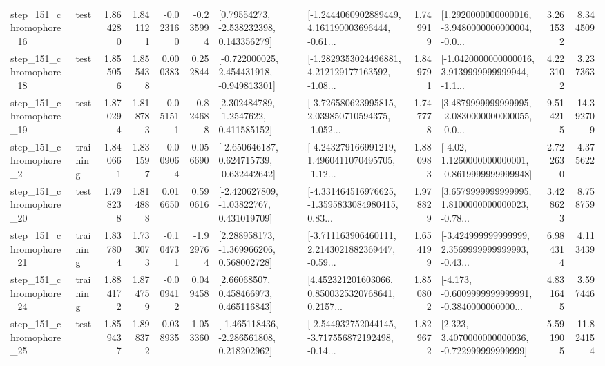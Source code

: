 \begin{tabular}{llrrrrllrlrr}
  step\_151\_chromophore\_16 &      test &      1.864280 &    1.841121 &     -0.023160 & -0.235994 &     [0.79554273, -2.538232398, 0.143356279] &  [-1.2444060902889449, 4.161190003696444, -0.61... &       1.749919 &  [1.2920000000000016, -3.9480000000000004, -0.0... &            3.261532 &          8.344509 \\
  step\_151\_chromophore\_18 &      test &      1.855056 &    1.855438 &      0.000383 &  0.252844 &   [-0.722000025, 2.454431918, -0.949813301] &  [-1.2829353024496881, 4.212129177163592, -1.08... &       1.849791 &  [-1.0420000000000016, 3.9139999999999944, -1.1... &            4.223102 &          3.237363 \\
  step\_151\_chromophore\_19 &      test &      1.870294 &    1.818783 &     -0.051511 & -0.824688 &      [2.302484789, -1.2547622, 0.411585152] &  [-3.726580623995815, 2.039850710594375, -1.052... &       1.747778 &  [3.4879999999999995, -2.0830000000000055, -0.0... &            9.514215 &         14.392709 \\
   step\_151\_chromophore\_2 &  training &      1.840661 &    1.831597 &     -0.009064 &  0.056690 &   [-2.650646187, 0.624715739, -0.632442642] &  [-4.243279166991219, 1.4960411070495705, -1.12... &       1.880983 &   [-4.02, 1.1260000000000001, -0.8619999999999948] &            2.722630 &          4.375622 \\
  step\_151\_chromophore\_20 &      test &      1.798238 &    1.814888 &      0.016650 &  0.590616 &    [-2.420627809, -1.03822767, 0.431019709] &  [-4.331464516976625, -1.3595833084980415, 0.83... &       1.978829 &  [3.6579999999999995, 1.8100000000000023, -0.78... &            3.428623 &          8.758759 \\
  step\_151\_chromophore\_21 &  training &      1.837804 &    1.733073 &     -0.104731 & -1.929764 &    [2.288958173, -1.369966206, 0.568002728] &  [-3.711163906460111, 2.2143021882369447, -0.59... &       1.654199 &  [-3.424999999999999, 2.3569999999999993, -0.43... &            6.984314 &          4.113439 \\
  step\_151\_chromophore\_24 &  training &      1.884172 &    1.874759 &     -0.009412 &  0.049458 &      [2.66068507, 0.458466973, 0.465116843] &  [4.452321201603066, 0.8500325320768641, 0.2157... &       1.850802 &  [-4.173, -0.6009999999999991, -0.3840000000000... &            4.831645 &          3.597446 \\
  step\_151\_chromophore\_25 &      test &      1.859437 &    1.898372 &      0.038935 &  1.053360 &   [-1.465118436, -2.286561808, 0.218202962] &  [-2.544932752044145, -3.717556872192498, -0.14... &       1.829672 &    [2.323, 3.4070000000000036, -0.722999999999999] &            5.591905 &         11.824154 \\

\end{tabular}
